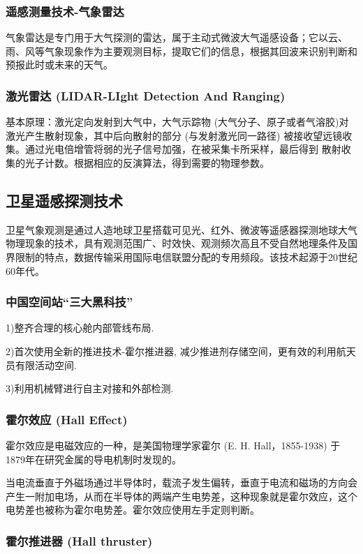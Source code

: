 \documentclass[12pt,a4paper]{article}
\begin{document}
	\subsubsection{遥感测量技术-气象雷达}
	气象雷达是专门用于大气探测的雷达，属于主动式微波大气遥感设备；它以云、雨、风等气象现象作为主要观测目标，提取它们的信息，根据其回波来识别判断和预报此时或未来的天气。
	\subsubsection{激光雷达 (LIDAR-LIght Detection And Ranging)}
	基本原理：激光定向发射到大气中，大气示踪物 (大气分子、原子或者气溶胶)对激光产生散射现象，其中后向散射的部分 (与发射激光同一路径) 被接收望远镜收集。通过光电倍增管将弱的光子信号加强，在被采集卡所采样，最后得到
	散射收集的光子计数。根据相应的反演算法，得到需要的物理参数。
	
	\subsection{卫星遥感探测技术}
	
	卫星气象观测是通过人造地球卫星搭载可见光、红外、微波等遥感器探测地球大气物理现象的技术，具有观测范围广、时效快、观测频次高且不受自然地理条件及国界限制的特点，数据传输采用国际电信联盟分配的专用频段。该技术起源于20世纪60年代。
	
	\subsubsection{中国空间站“三大黑科技”}
	1)整齐合理的核心舱内部管线布局.
	
	2)首次使用全新的推进技术-霍尔推进器, 减少推进剂存储空间，更有效的利用航天员有限活动空间.
	
	3)利用机械臂进行自主对接和外部检测.
	
	\subsubsection{霍尔效应 (Hall Effect)}
	
	霍尔效应是电磁效应的一种，是美国物理学家霍尔 (E. H. Hall，1855-1938) 于1879年在研究金属的导电机制时发现的。
	
	当电流垂直于外磁场通过半导体时，载流子发生偏转，垂直于电流和磁场的方向会产生一附加电场，从而在半导体的两端产生电势差，这种现象就是霍尔效应，这个电势差也被称为霍尔电势差。霍尔效应使用左手定则判断。
	
	\subsubsection{霍尔推进器 (Hall thruster)}
	
\end{document}
